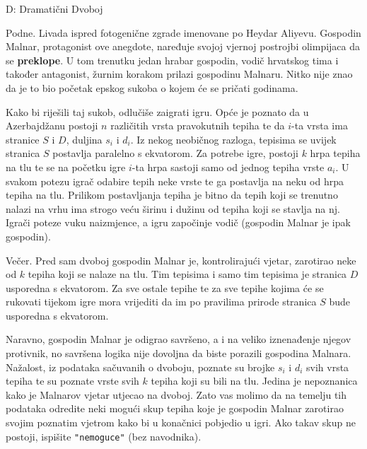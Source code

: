 

\begin{statement}[
  timelimit=1 s,
  memorylimit=512 MiB,
]{D: Dramatični Dvoboj}

Podne. Livada ispred fotogenične zgrade imenovane po Heydar Aliyevu. Gospodin
Malnar, protagonist ove anegdote, naređuje svojoj vjernoj postrojbi olimpijaca
da se \textbf{preklope}. U tom trenutku jedan hrabar gospodin, vodič hrvatskog
tima i također antagonist, žurnim korakom prilazi gospodinu Malnaru. Nitko nije
znao da je to bio početak epskog sukoba o kojem će se pričati godinama.

Kako bi riješili taj sukob, odlučiše zaigrati igru. Opće je poznato da u
Azerbajdžanu postoji $n$ različitih vrsta pravokutnih tepiha te da $i$-ta vrsta
ima stranice $S$ i $D$, duljina $s_i$ i $d_i$. Iz nekog neobičnog razloga,
tepisima se uvijek stranica $S$ postavlja paralelno s ekvatorom. Za potrebe
igre, postoji $k$ hrpa tepiha na tlu te se na početku igre $i$-ta hrpa sastoji
samo od jednog tepiha vrste $a_i$. U svakom potezu igrač odabire tepih
neke vrste te ga postavlja na neku od hrpa tepiha na tlu. Prilikom postavljanja
tepiha je bitno da tepih koji se trenutno nalazi na vrhu ima strogo veću širinu
i dužinu od tepiha koji se stavlja na nj. Igrači poteze vuku naizmjence, a igru
započinje vodič (gospodin Malnar je ipak gospodin).

Večer. Pred sam dvoboj gospodin Malnar je, kontrolirajući vjetar, zarotirao neke
od $k$ tepiha koji se nalaze na tlu. Tim tepisima i samo tim tepisima je
stranica $D$ usporedna s ekvatorom. Za sve ostale tepihe te za sve tepihe kojima
će se rukovati tijekom igre mora vrijediti da im po pravilima prirode stranica
$S$ bude usporedna s ekvatorom.

Naravno, gospodin Malnar je odigrao savršeno, a i na veliko iznenađenje njegov
protivnik, no savršena logika nije dovoljna da biste porazili gospodina
Malnara. Nažalost, iz podataka sačuvanih o dvoboju, poznate su brojke $s_i$ i
$d_i$ svih vrsta tepiha te su poznate vrste svih $k$ tepiha koji su bili na tlu.
Jedina je nepoznanica kako je Malnarov vjetar utjecao na dvoboj. Zato vas molimo
da na temelju tih podataka odredite neki mogući skup tepiha koje je gospodin
Malnar zarotirao svojim poznatim vjetrom kako bi u konačnici pobjedio u igri.
Ako takav skup ne postoji, ispišite \texttt{"nemoguce"} (bez navodnika).


\end{statement}
